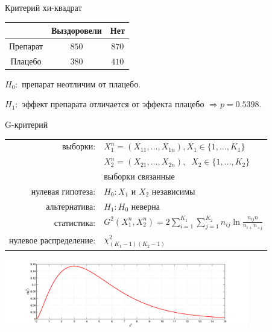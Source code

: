 \documentclass[9pt,pdf,utf8,hyperref={unicode},aspectratio=169]{beamer}
\begin{document}
\begin{frame}{Критерий хи-квадрат}
{		\begin{center}
			\begin{tabular}{|c|c|c|}
				\hline
				        &Выздоровели  &Нет\\\hline
				Препарат&$850$        &$870$\\\hline
				Плацебо &$380$        &$410$\\\hline
			\end{tabular}
		\end{center}
		
		\bigskip
		
		$H_0\colon$ препарат неотличим от плацебо.
		
		$H_1\colon$ эффект препарата отличается от эффекта плацебо $\Rightarrow p = 0.5398.$
	}
\end{frame}

\begin{frame}{G-критерий}
	\begin{center}
		\begin{tabular}{rl}
			выборки:                        & $X_1^n=\left(X_{11},\ldots,X_{1n}\right), X_{1}\in\{1,\ldots,K_1\}$\\
											& $X_2^n=\left(X_{21},\ldots,X_{2n}\right), \;\; X_{2}\in\{1,\ldots,K_2\}$ \\
											& выборки связанные\\
			нулевая гипотеза:               & $H_0\colon X_1$ и $X_2$ независимы\\
			альтернатива:                   & $H_1\colon H_0$ неверна\\
			статистика:                     & $G^2\left(X_1^n, X_2^n\right) = 2 \sum\limits_{i=1}^{K_1} \sum\limits_{j=1}^{K_2} n_{ij} \ln\frac{n_{ij}n}{n_{i+}n_{+j}}$ \\
			нулевое распределение:          & $\chi^2_{\left(K_1-1\right)\left(K_2-1\right)}$\\
		\end{tabular}
		\includegraphics[width=0.8\textwidth]{chi2.png}
	\end{center}
\end{frame}
\end{document}
